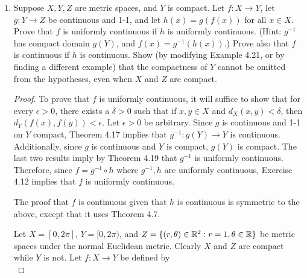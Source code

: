 \documentclass[../psets.tex]{subfiles}
\begin{document}
\begin{enumerate}[label={\textbf{\arabic*.}}]
\begin{enumerate}
\begin{proof}
            $C_1$ and $C_2$ are both closed since every point in each is isolated.\par
            $C_1+C_2$ is countable since we can define a natural injection from it to $C_1\times C_2$ and we know that cross products of countable sets are countable. $C_1+C_2$ is dense in $\R^1$ since the set of all fractional parts of all $n\alpha\in C_2$ is dense in $[0,1]$ because $\alpha$ is irrational (and thus there is no repeating cycle), and we can shift this dense segment using values in $C_1$. Thus, since $C_1+C_2$ is a countable dense subset of $\R^1$, $\overline{C_1+C_2}=\R^1$ is uncountable, i.e., contains more elements than $C_1+C_2$, showing that $C_1+C_2$ is not closed.
        \end{proof}
    \end{enumerate}
    \item Suppose $X,Y,Z$ are metric spaces, and $Y$ is compact. Let $f:X\to Y$, let $g:Y\to Z$ be continuous and 1-1, and let $h(x)=g(f(x))$ for all $x\in X$. Prove that $f$ is uniformly continuous if $h$ is uniformly continuous. (Hint: $g^{-1}$ has compact domain $g(Y)$, and $f(x)=g^{-1}(h(x))$.) Prove also that $f$ is continuous if $h$ is continuous. Show (by modifying Example 4.21, or by finding a different example) that the compactness of $Y$ cannot be omitted from the hypotheses, even when $X$ and $Z$ are compact.
    \begin{proof}
        To prove that $f$ is uniformly continuous, it will suffice to show that for every $\epsilon>0$, there exists a $\delta>0$ such that if $x,y\in X$ and $d_X(x,y)<\delta$, then $d_Y(f(x),f(y))<\epsilon$. Let $\epsilon>0$ be arbitrary. Since $g$ is continuous and 1-1 on $Y$ compact, Theorem 4.17 implies that $g^{-1}:g(Y)\to Y$ is continuous. Additionally, since $g$ is continuous and $Y$ is compact, $g(Y)$ is compact. The last two results imply by Theorem 4.19 that $g^{-1}$ is uniformly continuous. Therefore, since $f=g^{-1}\circ h$ where $g^{-1},h$ are uniformly continuous, Exercise 4.12 implies that $f$ is uniformly continuous.\par
        The proof that $f$ is continuous given that $h$ is continuous is symmetric to the above, except that it uses Theorem 4.7.\par
        Let $X=[0,2\pi]$, $Y=[0,2\pi)$, and $Z=\{(r,\theta)\in\mathbb{R}^2:r=1,\theta\in\mathbb{R}\}$ be metric spaces under the normal Euclidean metric. Clearly $X$ and $Z$ are compact while $Y$ is not. Let $f:X\to Y$ be defined by
        \begin{equation*}

\end{equation*}
\end{proof}
\end{enumerate}
\end{document}
